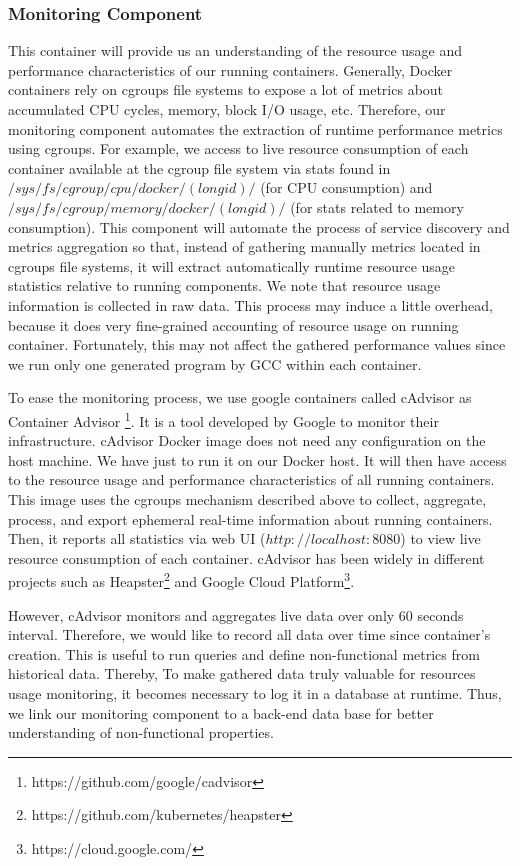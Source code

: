 \subsubsection{Monitoring Component}
This container will provide us an understanding of the resource usage and performance characteristics of our running containers. Generally, Docker containers rely on cgroups file systems to expose a lot of metrics about accumulated CPU cycles, memory, block I/O usage, etc. Therefore, our monitoring component automates the extraction of runtime performance metrics using cgroups. For example, we access to live resource consumption of each container available at the cgroup file system via stats found in $/sys/fs/cgroup/cpu/docker/(longid)/$ (for CPU consumption) and $/sys/fs/cgroup/memory/docker/(longid)/$ (for stats related to memory consumption). This component will automate the process of service discovery and metrics aggregation so that, instead of gathering manually metrics located in cgroups file systems, it will extract automatically runtime resource usage statistics relative to running components. We note that resource usage information is collected in raw data. This process may induce a little overhead, because it does very fine-grained accounting of resource usage on running container. Fortunately, this may not affect the gathered performance values since we run only one generated program by GCC within each container.

To ease the monitoring process, we use google containers called cAdvisor as Container Advisor \footnote{https://github.com/google/cadvisor}. It is a tool developed by Google to monitor their infrastructure. 
cAdvisor Docker image does not need any configuration on the host machine. We have just to run it on our Docker host. It will then have access to the resource usage and performance characteristics of all running containers. This image uses the cgroups mechanism described above to collect, aggregate, process, and export ephemeral real-time information about running containers. Then, it reports all statistics via web UI ($http://localhost:8080$) to view live resource consumption of each container. cAdvisor has been widely in different projects such as Heapster\footnote{https://github.com/kubernetes/heapster} and Google Cloud Platform\footnote{https://cloud.google.com/}.

However, cAdvisor monitors and aggregates live data over only 60 seconds interval. Therefore, we would like to record all data over time since container's creation. This is useful to run queries and define non-functional metrics from historical data. Thereby, To make gathered data truly valuable for resources usage monitoring, it becomes necessary to log it in a database at runtime. Thus, we link our monitoring component to a back-end data base for better understanding of non-functional properties. 
